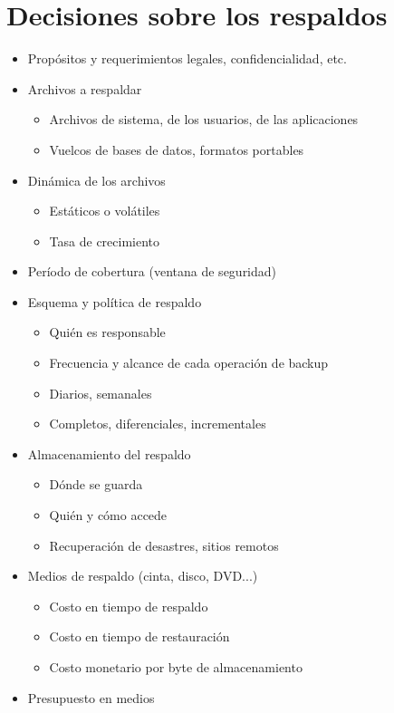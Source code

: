 
\section{Decisiones sobre los respaldos}
\begin{itemize}
	\item Propósitos y requerimientos legales, confidencialidad, etc.
	\item Archivos a respaldar 
	\begin{itemize}
		\item Archivos de sistema, de los usuarios, de las aplicaciones
		\item Vuelcos de bases de datos, formatos portables
	\end{itemize}	
	\item Dinámica de los archivos
	\begin{itemize}
		\item Estáticos o volátiles 
		\item Tasa de crecimiento 
	\end{itemize}
	\item Período de cobertura (ventana de seguridad)
	\item Esquema y política de respaldo 
	\begin{itemize}
		\item Quién es responsable
		\item Frecuencia y alcance de cada operación de backup
		\item Diarios, semanales
		\item Completos, diferenciales, incrementales
	\end{itemize}
	\item Almacenamiento del respaldo 
	\begin{itemize}
		\item Dónde se guarda
		\item Quién y cómo accede
		\item Recuperación de desastres, sitios remotos
	\end{itemize}
	\item Medios de respaldo (cinta, disco, DVD...)
	\begin{itemize}
		\item Costo en tiempo de respaldo
		\item Costo en tiempo de restauración
		\item Costo monetario por byte de almacenamiento 
	\end{itemize}
	\item Presupuesto en medios

\end{itemize}
